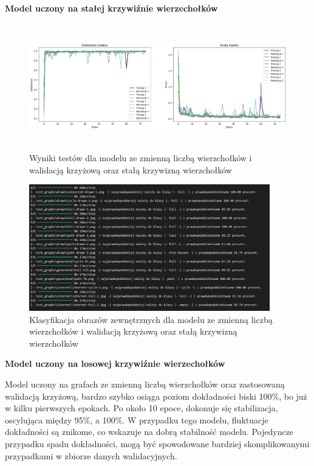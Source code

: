 \textbf{Model uczony na stałej krzywiźnie wierzechołków}

\begin{figure}[ht]
	\centering
	\includegraphics[height=5.5cm]{resources/tests/images/v2/multiple_edges_crossvalid_img.png}
	\caption{Wyniki testów dla modelu ze zmienną liczbą wierzchołków i walidacją krzyżową oraz stałą krzywizną wierzchołków}
	\label{Fig:tests-csvar-1}
\end{figure}
\FloatBarrier

\begin{figure}[ht]
	\centering
	\includegraphics[height=5.5cm]{resources/tests/images/v2/multiple_edges_crossvalid_txt.png}
	\caption{Klasyfikacja obrazów zewnętrznych dla modelu ze zmienną liczbą wierzchołków i walidacją krzyżową oraz stałą krzywizną wierzchołków}
	\label{Fig:tests-csvar-2}
\end{figure}
\FloatBarrier

\textbf{Model uczony na losowej krzywiźnie wierzechołków}

Model uczony na grafach ze zmienną liczbą wierzchołków oraz zastosowaną walidacją krzyżową,
bardzo szybko osiąga poziom dokładności biski 100\%, bo już w kilku pierwszych epokach.
Po około 10 epoce, dokonuje się stabilizacja, oscylująca między 95\%, a 100\%.
W przypadku tego modelu, fluktuacje dokładności są znikome, co wskazuje na dobrą stabilność modelu.
Pojedyncze przypadku spadu dokładności, mogą być spowodowane bardziej skomplikowanymi
przypadkami w zbiorze danych walidacyjnych.

